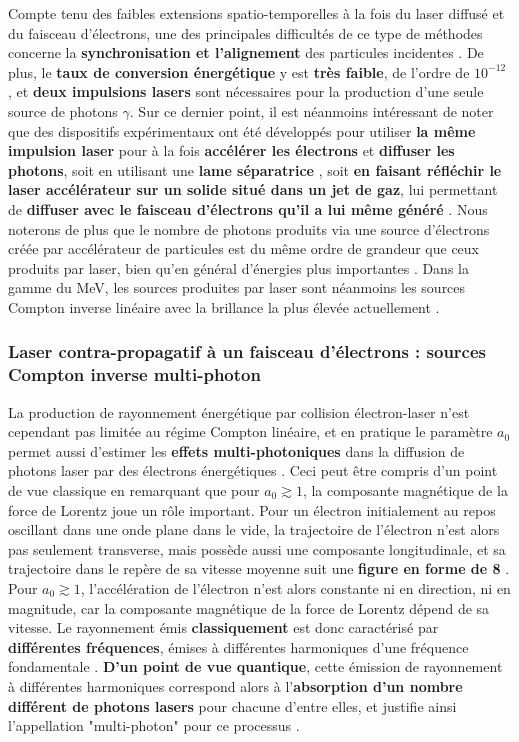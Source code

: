 \begin{refsection}
Compte tenu des faibles extensions spatio-temporelles à la fois du laser diffusé et du faisceau d'électrons, une des principales difficultés de ce type de méthodes concerne la \textbf{synchronisation et l'alignement} des particules incidentes \parencite{corde_2013a, albert_2016}. De plus, le \textbf{taux de conversion énergétique} y est \textbf{très faible}, de l'ordre de $10^{-12}$ \parencite{albert_2016}, et \textbf{deux impulsions lasers} sont nécessaires pour la production d'une seule source de photons $\gamma$. Sur ce dernier point, il est néanmoins intéressant de noter que des dispositifs expérimentaux ont été développés pour utiliser \textbf{la même impulsion laser} pour à la fois \textbf{accélérer les électrons} et \textbf{diffuser les photons}, soit en utilisant une \textbf{lame séparatrice} \parencite{chen_2013a}, soit \textbf{en faisant réfléchir le laser accélérateur sur un solide situé dans un jet de gaz}, lui permettant de \textbf{diffuser avec le faisceau d'électrons qu'il a lui même généré} \parencite{phuoc_2012}. Nous noterons de plus que le nombre de photons produits via une source d'électrons créée par accélérateur de particules est du même ordre de grandeur que ceux produits par laser, bien qu'en général d'énergies plus importantes \parencite{albert_2016}. Dans la gamme du MeV, les sources produites par laser sont néanmoins les sources Compton inverse linéaire avec la brillance la plus élevée actuellement \parencite{yu_2016}.

\subsubsection{Laser contra-propagatif à un faisceau d'électrons : sources Compton inverse multi-photon}

La production de rayonnement énergétique par collision électron-laser n'est cependant pas limitée au régime Compton linéaire, et en pratique le paramètre $a_0$ permet aussi d'estimer les \textbf{effets multi-photoniques} dans la diffusion de photons laser par des électrons énergétiques \parencite{corde_2013a, dipiazza_2012}. Ceci peut être compris d'un point de vue classique en remarquant que pour $a_0 \gtrsim 1$, la composante magnétique de la force de Lorentz joue un rôle important. Pour un électron initialement au repos oscillant dans une onde plane dans le vide, la trajectoire de l'électron n'est alors pas seulement transverse, mais possède aussi une composante longitudinale, et sa trajectoire dans le repère de sa vitesse moyenne suit une \textbf{figure en forme de 8} \parencite{yang_2011}. Pour $a_0 \gtrsim 1$, l'accélération de l'électron n'est alors constante ni en direction, ni en magnitude, car la composante magnétique de la force de Lorentz dépend de sa vitesse. Le rayonnement émis \textbf{classiquement} est donc caractérisé par \textbf{différentes fréquences}, émises à différentes harmoniques d'une fréquence fondamentale \parencite{lau_2003}. \textbf{D'un point de vue quantique}, cette émission de rayonnement à différentes harmoniques correspond alors à l'\textbf{absorption d'un nombre différent de photons lasers} pour chacune d'entre elles, et justifie ainsi l'appellation "multi-photon" pour ce processus \parencite{dipiazza_2012}. 


\end{refsection}
